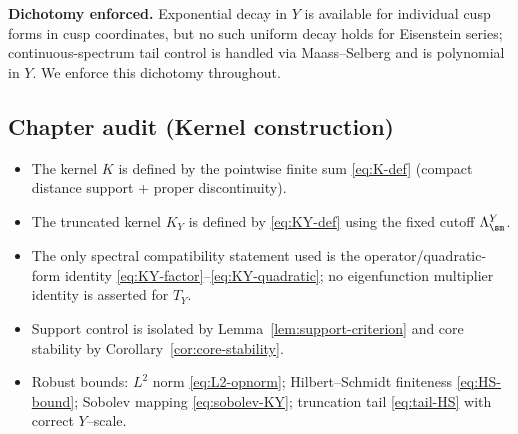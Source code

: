 \noindent
\textbf{Dichotomy enforced.}
Exponential decay in $Y$ is available for individual cusp forms in cusp coordinates, but no such uniform
decay holds for Eisenstein series; continuous-spectrum tail control is handled via Maass--Selberg and is
polynomial in $Y$. We enforce this dichotomy throughout.

\subsection*{Chapter audit (Kernel construction)}\label{audit:ch3-annals}

\begin{itemize}
\item[(K1)] The kernel $K$ is defined by the pointwise finite sum \eqref{eq:K-def} (compact distance support + proper discontinuity).
\item[(K2)] The truncated kernel $K_Y$ is defined by \eqref{eq:KY-def} using the fixed cutoff $\Lambda^Y_{\sm}$.
\item[(K3)] The only spectral compatibility statement used is the operator/quadratic-form identity
      \eqref{eq:KY-factor}--\eqref{eq:KY-quadratic}; no eigenfunction multiplier identity is asserted for $T_Y$.
\item[(K4)] Support control is isolated by Lemma~\ref{lem:support-criterion} and core stability by Corollary~\ref{cor:core-stability}.
\item[(K5)] Robust bounds: $L^2$ norm \eqref{eq:L2-opnorm}; Hilbert--Schmidt finiteness \eqref{eq:HS-bound};
      Sobolev mapping \eqref{eq:sobolev-KY}; truncation tail \eqref{eq:tail-HS} with correct $Y$--scale.
\end{itemize}

